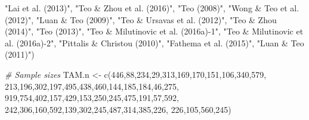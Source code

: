 \documentclass[
]{book}
\newenvironment{Shaded}{\begin{snugshade}}{\end{snugshade}}
\newcommand{\CommentTok}[1]{\textcolor[rgb]{0.56,0.35,0.01}{\textit{#1}}}
\newcommand{\DecValTok}[1]{\textcolor[rgb]{0.00,0.00,0.81}{#1}}
\newcommand{\FunctionTok}[1]{\textcolor[rgb]{0.00,0.00,0.00}{#1}}
\newcommand{\NormalTok}[1]{#1}
\newcommand{\OtherTok}[1]{\textcolor[rgb]{0.56,0.35,0.01}{#1}}
\newcommand{\StringTok}[1]{\textcolor[rgb]{0.31,0.60,0.02}{#1}}
\begin{document}
\begin{Shaded}
\begin{Highlighting}[]
                    \StringTok{"Lai et al. (2013)"}\NormalTok{,}
                    \StringTok{"Teo \& Zhou et al. (2016)"}\NormalTok{,}
                    \StringTok{"Teo (2008)"}\NormalTok{,}
                    \StringTok{"Wong \& Teo et al. (2012)"}\NormalTok{,}
                    \StringTok{"Luan \& Teo (2009)"}\NormalTok{,}
                    \StringTok{"Teo \& Ursavas et al. (2012)"}\NormalTok{,}
                    \StringTok{"Teo \& Zhou (2014)"}\NormalTok{,}
                    \StringTok{"Teo (2013)"}\NormalTok{,}
                    \StringTok{"Teo \& Milutinovic et al. (2016a){-}1"}\NormalTok{,}
                    \StringTok{"Teo \& Milutinovic et al. (2016a){-}2"}\NormalTok{,}
                    \StringTok{"Pittalis \& Christou (2010)"}\NormalTok{,}
                    \StringTok{"Fathema et al. (2015)"}\NormalTok{,}
                    \StringTok{"Luan \& Teo (2011)"}\NormalTok{)}

\CommentTok{\# Sample sizes}
\NormalTok{TAM.n }\OtherTok{\textless{}{-}} \FunctionTok{c}\NormalTok{(}\DecValTok{446}\NormalTok{,}\DecValTok{88}\NormalTok{,}\DecValTok{234}\NormalTok{,}\DecValTok{29}\NormalTok{,}\DecValTok{313}\NormalTok{,}\DecValTok{169}\NormalTok{,}\DecValTok{170}\NormalTok{,}\DecValTok{151}\NormalTok{,}\DecValTok{106}\NormalTok{,}\DecValTok{340}\NormalTok{,}\DecValTok{579}\NormalTok{,}
            \DecValTok{213}\NormalTok{,}\DecValTok{196}\NormalTok{,}\DecValTok{302}\NormalTok{,}\DecValTok{197}\NormalTok{,}\DecValTok{495}\NormalTok{,}\DecValTok{438}\NormalTok{,}\DecValTok{460}\NormalTok{,}\DecValTok{144}\NormalTok{,}\DecValTok{185}\NormalTok{,}\DecValTok{184}\NormalTok{,}\DecValTok{46}\NormalTok{,}\DecValTok{275}\NormalTok{,}
            \DecValTok{919}\NormalTok{,}\DecValTok{754}\NormalTok{,}\DecValTok{402}\NormalTok{,}\DecValTok{157}\NormalTok{,}\DecValTok{429}\NormalTok{,}\DecValTok{153}\NormalTok{,}\DecValTok{250}\NormalTok{,}\DecValTok{245}\NormalTok{,}\DecValTok{475}\NormalTok{,}\DecValTok{191}\NormalTok{,}\DecValTok{57}\NormalTok{,}\DecValTok{592}\NormalTok{,}
            \DecValTok{242}\NormalTok{,}\DecValTok{306}\NormalTok{,}\DecValTok{160}\NormalTok{,}\DecValTok{592}\NormalTok{,}\DecValTok{139}\NormalTok{,}\DecValTok{302}\NormalTok{,}\DecValTok{245}\NormalTok{,}\DecValTok{487}\NormalTok{,}\DecValTok{314}\NormalTok{,}\DecValTok{385}\NormalTok{,}\DecValTok{226}\NormalTok{,}
            \DecValTok{226}\NormalTok{,}\DecValTok{105}\NormalTok{,}\DecValTok{560}\NormalTok{,}\DecValTok{245}\NormalTok{)}


\end{Highlighting}
\end{Shaded}
\end{document}
